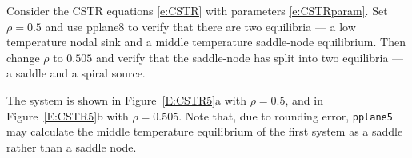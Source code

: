 \documentclass{ximera}
\begin{document}
\begin{exercise}  \label{E:CSTR5}
Consider the CSTR equations \eqref{e:CSTR} with parameters 
\eqref{e:CSTRparam}. Set $\rho=0.5$ and use 
{\sf pplane8} to verify 
that there are two equilibria --- a low temperature nodal sink 
and a middle temperature saddle-node equilibrium.  Then change 
$\rho$ to $0.505$ and verify that the saddle-node has split 
into two equilibria --- a saddle and a spiral source.

\begin{solution}

The system is shown in Figure~\ref{E:CSTR5}a with $\rho = 0.5$, and in
Figure~\ref{E:CSTR5}b with $\rho = 0.505$.  Note that, due to rounding
error, {\tt pplane5} may calculate the middle temperature equilibrium of
the first system as a saddle rather than a saddle node.  

\begin{figure}[htb]
                       \centerline{%
                       }
\end{figure}

\end{solution}
\end{exercise}
\end{document}
